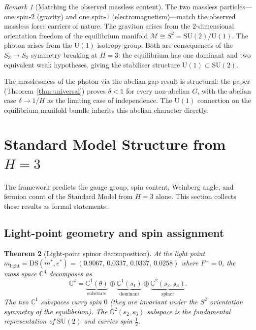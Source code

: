 \documentclass[11pt,a4paper]{article}
\newtheorem{theorem}{Theorem}[section]
\theoremstyle{definition}
\theoremstyle{remark}
\newtheorem{remark}[theorem]{Remark}
\newcommand{\C}{\mathbb{C}}
\newcommand{\SU}{\mathrm{SU}}
\begin{document}
\begin{remark}[Matching the observed massless content]\label{rem:massless_match}
The two massless particles---one spin-$2$ (gravity) and one spin-$1$ (electromagnetism)---match the observed massless force carriers of nature. The graviton arises from the $2$-dimensional orientation freedom of the equilibrium manifold $\mathcal{M}\cong S^2=\mathrm{SU}(2)/\mathrm{U}(1)$. The photon arises from the $\mathrm{U}(1)$ isotropy group. Both are consequences of the $S_3\to S_2$ symmetry breaking at $H=3$: the equilibrium has one dominant and two equivalent weak hypotheses, giving the stabiliser structure $\mathrm{U}(1)\subset\mathrm{SU}(2)$.

The masslessness of the photon via the abelian gap result is structural: the paper (Theorem~\ref{thm:universal}) proves $\delta<1$ for every non-abelian $G$, with the abelian case $\delta\to 1/H$ as the limiting case of independence. The $\mathrm{U}(1)$ connection on the equilibrium manifold bundle inherits this abelian character directly.
\end{remark}

\section{Standard Model Structure from $H=3$}\label{sec:sm}

The framework predicts the gauge group, spin content, Weinberg angle, and fermion count of the Standard Model from $H=3$ alone. This section collects these results as formal statements.

\subsection{Light-point geometry and spin assignment}\label{sec:lightpoint}

\begin{theorem}[Light-point spinor decomposition]\label{thm:lightpoint_decomp}
At the light point $m_\mathrm{light}=\mathrm{DS}(m^*,e^*)=(0.9067,\,0.0337,\,0.0337,\,0.0258)$ where $F^+=0$, the mass space $\C^4$ decomposes as
\begin{equation}\label{eq:spinor_decomp}
\C^4 = \underbrace{\C^1(\theta)}_{\mathrm{substrate}} \oplus \underbrace{\C^1(s_1)}_{\mathrm{dominant}} \oplus \underbrace{\C^2(s_2,s_3)}_{\mathrm{spinor}}.
\end{equation}
The two $\C^1$ subspaces carry spin $0$ (they are invariant under the $S^2$ orientation symmetry of the equilibrium). The $\C^2(s_2,s_3)$ subspace is the fundamental representation of $\SU(2)$ and carries spin $\tfrac{1}{2}$.
\end{theorem}
\end{document}
